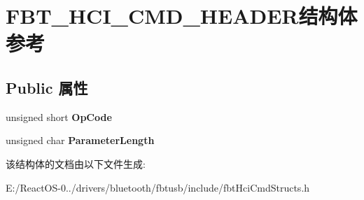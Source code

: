 \hypertarget{struct_f_b_t___h_c_i___c_m_d___h_e_a_d_e_r}{}\section{F\+B\+T\+\_\+\+H\+C\+I\+\_\+\+C\+M\+D\+\_\+\+H\+E\+A\+D\+E\+R结构体 参考}
\label{struct_f_b_t___h_c_i___c_m_d___h_e_a_d_e_r}
\subsection*{Public 属性}
\begin{DoxyCompactItemize}
\item 
\mbox{\label{struct_f_b_t___h_c_i___c_m_d___h_e_a_d_e_r_a78c24246221b031b9cc031019910a109}} 
unsigned short {\bfseries Op\+Code}
\item 
\mbox{\label{struct_f_b_t___h_c_i___c_m_d___h_e_a_d_e_r_af0fd5588cd8348a347e95736f190dc43}} 
unsigned char {\bfseries Parameter\+Length}
\end{DoxyCompactItemize}


该结构体的文档由以下文件生成\+:\begin{DoxyCompactItemize}
\item 
E\+:/\+React\+O\+S-\/0../drivers/bluetooth/fbtusb/include/fbt\+Hci\+Cmd\+Structs.\+h\end{DoxyCompactItemize}
